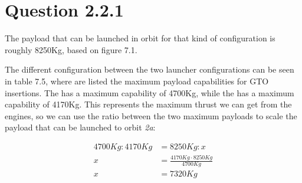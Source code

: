 \documentclass[9pt,a4paper]{scrreprt}
\begin{document}
      
    \section*{Question 2.2.1}
      
      The payload that can be launched in orbit for that kind of configuration is roughly 8250Kg, based on figure 7.1.

      The different configuration between the two launcher configurations can be seen in table 7.5, where are listed the maximum payload
      capabilities for GTO insertions. The  has a maximum capability of 4700Kg, while the  has a maximum
      capability of 4170Kg. This represents the maximum thrust we can get from the engines, so we can use the ratio between the two maximum
      payloads to scale the payload that can be launched to orbit \emph{2a}:

      \begin{align*}
        4700Kg : 4170Kg &= 8250Kg : x \\
        x &= \frac{4170Kg \cdot 8250Kg}{4700Kg} \\
        x &= 7320Kg
      \end{align*}
\end{document}
